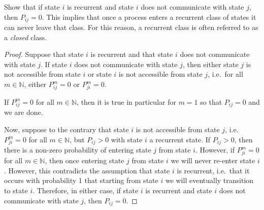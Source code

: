 \begin{problem}{4.16}
  Show that if state $i$ is recurrent and state $i$ does not communicate with state
  $j$, then $P_{ij} = 0$. This implies that once a process enters a recurrent class
  of states it can never leave that class. For this reason, a recurrent class
  is often referred to as a \emph{closed} class.
\end{problem}

\begin{proof}
  Suppose that state $i$ is recurrent and that state $i$ does not communicate with state $j$.
  If state $i$ does not communicate with state $j$, then either state $j$ is not accessible
  from state $i$ or state $i$ is not accessible from state $j$, i.e.\ for all $m\in\mathbb{N}$,
  either $P_{ij}^m = 0$ or $P_{ji}^m = 0$.

  If $P_{ij}^m = 0$ for all $m\in\mathbb{N}$, then it is true in particular for $m=1$ so
  that $P_{ij} = 0$ and we are done.

  Now, suppose to the contrary that state $i$ is not accessible from state $j$, i.e.\
  $P_{ji}^m = 0$ for all $m\in\mathbb{N}$, but $P_{ij} > 0$  with state $i$ a recurrent state.
  If $P_{ij} > 0$, then there is a non-zero probability of entering state $j$ from state $i$. However,
  if $P_{ji}^m = 0$ for all $m\in\mathbb{N}$, then once entering state $j$ from state $i$
  we will never re-enter state $i$. However, this contradicts the assumption that
  state $i$ is recurrent, i.e.\ that it occurs with probability 1 that starting from state $i$ we
  will eventually transition to state $i$. Therefore, in either case, if state $i$ is
  recurrent and state $i$ does not communicate with state $j$, then $P_{ij} = 0$.
\end{proof}
\newpage

